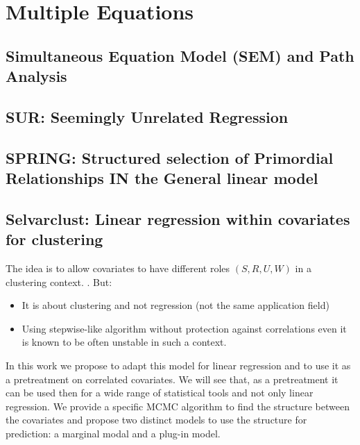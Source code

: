 \documentclass[12pt,a4paper]{report}
\begin{document}
			
	\section{Multiple Equations}		%
		
		\subsection{Simultaneous Equation Model (SEM) and Path Analysis}		%
			\cite{davidson1993estimation,pearl2000causality,pearl1998graphs,brito2006graphical}%
		\subsection{SUR: Seemingly Unrelated Regression}		%

			\cite{SURzellner}
		\subsection{SPRING: Structured selection of Primordial Relationships IN the General linear model}		%

			\cite{chiquetconf}			
			
		\subsection{Selvarclust: Linear regression within covariates for clustering}		%

			\cite{maugis2009variable}
			The idea is to allow covariates to have different roles $(S,R,U,W)$ in a clustering context. .
			But:
			\begin{itemize}
				\item It is about clustering and not regression (not the same application field)
				\item Using stepwise-like algorithm without protection against correlations \cite{raftery2006variable} even it is known to be often unstable \cite{miller2002subset} in such a context.
			\end{itemize}
			In this work we propose to adapt this model for linear regression and to use it as a pretreatment on correlated covariates. We will see that, as a pretreatment it can be used then for a wide range of statistical tools and not only linear regression.
			We provide a specific MCMC algorithm to find the structure between the covariates and propose two distinct models to use the structure for prediction: a marginal modal and a plug-in model.	
			
\end{document}
